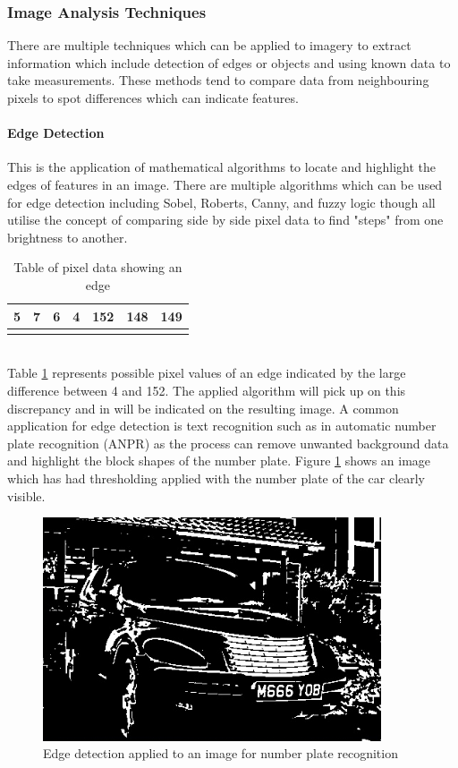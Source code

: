 \subsubsection{Image Analysis Techniques}
	There are multiple techniques which can be applied to imagery to extract information which include detection of edges or objects and using known data to take measurements. These methods tend to compare data from neighbouring pixels to spot differences which can indicate features.
	\paragraph{Edge Detection}
	This is the application of mathematical algorithms to locate and highlight the edges of features in an image. There are multiple algorithms which can be used for edge detection including Sobel, Roberts, Canny, and fuzzy logic though all utilise the concept of comparing side by side pixel data to find "steps" from one brightness to another.
	\begin{table}[h!]
		\centering
		\caption{Table of pixel data showing an edge}
		\label{tab:edgePixels}
		\begin{tabular}{|c|c|c|c|c|c|c|}
			\hline
			5&7&6&4&152&148&149\\
			\hline
			\cellcolor[HTML]{0D0D0D}&
			\cellcolor[HTML]{121212}&
			\cellcolor[HTML]{0F0F0F}&
			\cellcolor[HTML]{0a0a0a}&
			\cellcolor[HTML]{989898}&
			\cellcolor[HTML]{949494}&
			\cellcolor[HTML]{959595}\\
			\hline
		\end{tabular}
	\end{table}\\
	Table \ref{tab:edgePixels} represents possible pixel values of an edge indicated by the large difference between 4 and 152. The applied algorithm will pick up on this discrepancy and in will be indicated on the resulting image. A common application for edge detection is text recognition such as in automatic number plate recognition (ANPR) \citep{anpr} as the process can remove unwanted background data and highlight the block shapes of the number plate. Figure \ref{fig:anpr} shows an image which has had thresholding applied with the number plate of the car clearly visible.
	\begin{figure}[h!]
		\centering
		\includegraphics[width=10cm]{../images/anpr.jpg}
		\caption{Edge detection applied to an image for number plate recognition}
		\label{fig:anpr}
	\end{figure} 
